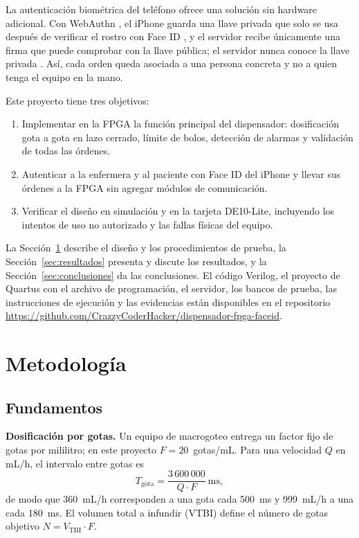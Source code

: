 \documentclass[11pt,letterpaper]{article}
\begin{document}
La autenticación biométrica del teléfono ofrece una solución sin hardware adicional. Con WebAuthn \cite{webauthn}, el iPhone guarda una llave privada que solo se usa después de verificar el rostro con Face ID \cite{apple_passkeys,apple_biometric}, y el servidor recibe únicamente una firma que puede comprobar con la llave pública; el servidor nunca conoce la llave privada \cite{apple_passkeys}. Así, cada orden queda asociada a una persona concreta y no a quien tenga el equipo en la mano.

Este proyecto tiene tres objetivos:
\begin{enumerate}
\item Implementar en la FPGA la función principal del dispensador: dosificación gota a gota en lazo cerrado, límite de bolos, detección de alarmas y validación de todas las órdenes.
\item Autenticar a la enfermera y al paciente con Face ID del iPhone y llevar sus órdenes a la FPGA sin agregar módulos de comunicación.
\item Verificar el diseño en simulación y en la tarjeta DE10-Lite, incluyendo los intentos de uso no autorizado y las fallas físicas del equipo.
\end{enumerate}

La Sección~\ref{sec:metodologia} describe el diseño y los procedimientos de prueba, la Sección~\ref{sec:resultados} presenta y discute los resultados, y la Sección~\ref{sec:conclusiones} da las conclusiones. El código Verilog, el proyecto de Quartus con el archivo de programación, el servidor, los bancos de prueba, las instrucciones de ejecución y las evidencias están disponibles en el repositorio \url{https://github.com/CrazzyCoderHacker/dispensador-fpga-faceid}.

\section{Metodología}\label{sec:metodologia}

\subsection{Fundamentos}
\textbf{Dosificación por gotas.} Un equipo de macrogoteo entrega un factor fijo de gotas por mililitro; en este proyecto $F = 20$~gotas/mL. Para una velocidad $Q$ en mL/h, el intervalo entre gotas es
\begin{equation}
T_{\text{gota}} = \frac{3\,600\,000}{Q \cdot F}\ \text{ms},
\label{eq:intervalo}
\end{equation}
de modo que 360~mL/h corresponden a una gota cada 500~ms y 999~mL/h a una cada 180~ms. El volumen total a infundir (VTBI) define el número de gotas objetivo $N = V_{\text{TBI}} \cdot F$.
\end{document}
